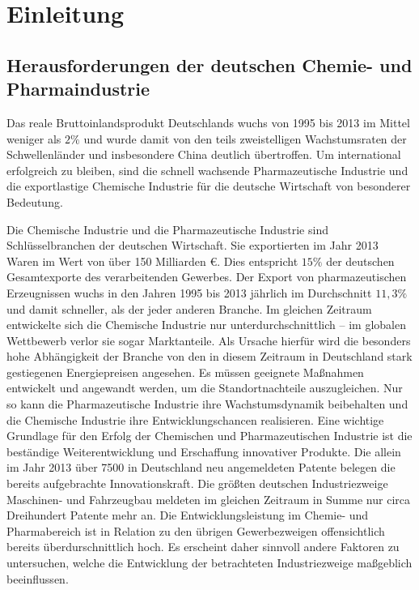\chapter{Einleitung}\label{ch:einleitung}
\section{Herausforderungen der deutschen Chemie- und Pharmaindustrie}\label{sec:einltg_chemPharmaIndustrie}
Das reale Bruttoinlandsprodukt Deutschlands wuchs von 1995 bis 2013 im Mittel weniger als $2\%$ und wurde damit von den teils zweistelligen Wachstumsraten der Schwellenl\"ander und insbesondere China deutlich \"ubertroffen. Um international erfolgreich zu bleiben, sind die schnell wachsende Pharmazeutische Industrie und die exportlastige Chemische Industrie f\"ur die deutsche Wirtschaft von besonderer Bedeutung. 

Die Chemische Industrie und die Pharmazeutische Industrie sind Schl\"usselbranchen der deutschen Wirtschaft. Sie exportierten im Jahr 2013 Waren im Wert von \"uber 150 Milliarden \euro. Dies entspricht $15 \%$ der deutschen Gesamtexporte des verarbeitenden Gewerbes. Der Export von pharmazeutischen Erzeugnissen wuchs in den Jahren 1995 bis 2013 j\"ahrlich im Durchschnitt $11,3 \%$ und damit schneller, als der jeder anderen Branche. Im gleichen Zeitraum entwickelte sich die Chemische Industrie nur unterdurchschnittlich -- im globalen Wettbewerb verlor sie sogar Marktanteile. Als Ursache hierf\"ur wird die besonders hohe Abh\"angigkeit der Branche von den in diesem Zeitraum in Deutschland stark gestiegenen Energiepreisen angesehen. Es m\"ussen geeignete Ma\ss{}nahmen entwickelt und angewandt werden, um die Standortnachteile auszugleichen. Nur so kann die Pharmazeutische Industrie ihre Wachstumsdynamik beibehalten und die Chemische Industrie ihre Entwicklungschancen realisieren. \linebreak
Eine wichtige Grundlage f\"ur den Erfolg der Chemischen und Pharmazeutischen Industrie ist die best\"andige Weiterentwicklung und Erschaffung innovativer Produkte. Die allein im Jahr 2013 \"uber 7500 in Deutschland neu angemeldeten Patente belegen die bereits aufgebrachte Innovationskraft. Die gr\"o\ss{}ten deutschen Industriezweige Maschinen- und Fahrzeugbau meldeten im gleichen Zeitraum in Summe nur circa Dreihundert Patente mehr an. Die Entwicklungsleistung im Chemie- und Pharmabereich ist in Relation zu den \"ubrigen Gewerbezweigen offensichtlich bereits \"uberdurschnittlich hoch. Es erscheint daher sinnvoll andere Faktoren zu untersuchen, welche die Entwicklung der betrachteten Industriezweige ma\ss{}geblich beeinflussen. \cite{PerspektiveD_2016}

